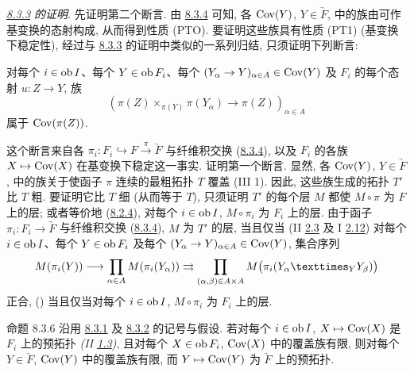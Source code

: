 \setcounter{subsubsection}{4}
\subsubsection{}
\emph{\hyperref[VI.prop8.3.3]{8.3.3} 的证明}.
先证明第二个断言.
由 \hyperref[VI.lem8.3.4]{8.3.4} 可知,
各 $\operatorname{Cov}(Y)$, $Y\in\underrightarrow{F}$,
中的族由可作基变换的态射构成, 从而得到性质 (PTO).
要证明这些族具有性质 (PT1) (基变换下稳定性),
经过与 \hyperref[VI.prop8.3.3]{8.3.3} 的证明中类似的一系列归结,
只须证明下列断言:

对每个 $i\in\operatorname{ob} I$、每个 $Y\in\operatorname{ob} F_i$、每个
$(Y_{\alpha}\to Y)_{\alpha\in A}\in\Cov(Y)$
及 $F_i$ 的每个态射 $u:Z\to Y$, 族
$$
(\pi(Z)\times_{\pi(Y)}\pi(Y_{\alpha})\to\pi(Z))_{\alpha\in A}
$$
属于 $\operatorname{Cov}(\pi(Z))$.

这个断言来自各
$\pi_i:F_i\hookrightarrow F\xrightarrow{\pi}\underrightarrow{F}$
与纤维积交换
(\hyperref[VI.lem8.3.4]{8.3.4}),
以及 $F_i$ 的各族 $X\mapsto\operatorname{Cov}(X)$ 在基变换下稳定这一事实.
证明第一个断言.
显然, 各 $\operatorname{Cov}(Y)$, $Y\in\underrightarrow{F}$,
中的族关于使函子 $\pi$ 连续的最粗拓扑 $T$ 覆盖 (III 1).
因此, 这些族生成的拓扑 $T'$ 比 $T$ 粗.
要证明它比\pageoriginale{} $T$ 细 (从而等于 $T$),
只须证明 $T'$ 的每个层 $M$ 都使 $M\circ\pi$ 为 $F$ 上的层;
或者等价地 (\hyperref[VI.rem8.2.4]{8.2.4}),
对每个 $i\in\operatorname{ob} I$, $M\circ\pi_i$ 为 $F_i$ 上的层.
由于函子 $\pi_i:F_i\to\underrightarrow{F}$ 与纤维积交换
(\hyperref[VI.lem8.3.4]{8.3.4}),
$M$ 为 $T'$ 的层, 当且仅当
(II \hyperref[II.cor2.3]{2.3} 及 I \hyperref[I.prop2.12]{2.12})
对每个 $i\in\operatorname{ob} I$、每个 $Y\in\operatorname{ob} F_i$ 及每个
$(Y_{\alpha}\to Y)_{\alpha\in A}\in\Cov(Y)$,
集合序列
$$
M(\pi_i(Y))\to\prod_{\alpha\in A}M(\pi_i(Y_{\alpha}))
\rightrightarrows\prod_{(\alpha,\beta)\in A\times A}
M\bigl(\pi_i(\fprod{Y_{\alpha}}{Y_{\beta}}{Y})\bigr)
$$
正合,
\ie (\loccit) 当且仅当对每个 $i\in\operatorname{ob} I$,
$M\circ\pi_i$ 为 $F_i$ 上的层.




\begin{enonce*}{命题 8.3.6}
沿用 \hyperref[VI.subsubsec8.3.1]{8.3.1}
及 \hyperref[VI.subsubsec8.3.2]{8.3.2} 的记号与假设.
若对每个 $i\in\operatorname{ob} I$,
$X\mapsto\operatorname{Cov}(X)$ 是 $F_i$ 上的预拓扑
\emph{(II \hyperref[II.def1.3]{1.3})},
且对每个 $X\in\operatorname{ob} F_i$, $\operatorname{Cov}(X)$ 中的覆盖族有限,
则对每个 $Y\in\underrightarrow{F}$,
$\operatorname{Cov}(Y)$ 中的覆盖族有限,
而 $Y\mapsto\operatorname{Cov}(Y)$ 为 $\underrightarrow{F}$ 上的预拓扑.
\end{enonce*}

